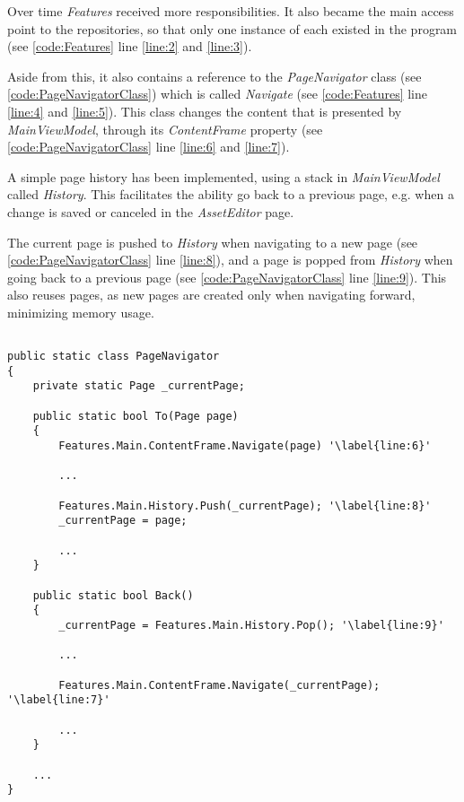 Over time \textit{Features} received more responsibilities. It also became the main access point to the repositories, so that only one instance of each existed in the program (see \autoref{code:Features} line \ref{line:2} and \ref{line:3}).
\par

Aside from this, it also contains a reference to the \textit{PageNavigator} class (see \autoref{code:PageNavigatorClass}) which is called \textit{Navigate} (see \autoref{code:Features} line \ref{line:4} and \ref{line:5}). This class changes the content that is presented by \textit{MainViewModel}, through its \textit{ContentFrame} property (see \autoref{code:PageNavigatorClass} line \ref{line:6} and \ref{line:7}). 
\par
A simple page history has been implemented, using a stack in \textit{MainViewModel} called \textit{History}. This facilitates the ability go back to a previous page, e.g. when a change is saved or canceled in the \textit{AssetEditor} page. 
\par
The current page is pushed to \textit{History} when navigating to a new page (see \autoref{code:PageNavigatorClass} line \ref{line:8}), and a page is popped from \textit{History} when going back to a previous page (see \autoref{code:PageNavigatorClass} line \ref{line:9}). This also reuses pages, as new pages are created only when navigating forward, minimizing memory usage.


\begin{listing}[H]
\begin{verbatim}

public static class PageNavigator
{
    private static Page _currentPage;
    
    public static bool To(Page page)
    {
        Features.Main.ContentFrame.Navigate(page) '\label{line:6}'
        
        ...
        
        Features.Main.History.Push(_currentPage); '\label{line:8}'
        _currentPage = page;
        
        ...
    }
    
    public static bool Back() 
    {
        _currentPage = Features.Main.History.Pop(); '\label{line:9}'
        
        ...
        
        Features.Main.ContentFrame.Navigate(_currentPage); '\label{line:7}'
        
        ...
    }
    
    ...
}

\end{verbatim}
\label{code:PageNavigatorClass}
\end{listing}

